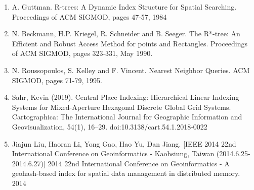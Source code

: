 %




\begin{enumerate}
    \item A. Guttman. R-trees: A Dynamic Index Structure for Spatial Searching. Proceedings of ACM SIGMOD, pages 47-57, 1984
    \item N. Beckmann, H.P. Kriegel, R. Schneider and B. Seeger. The R*-tree: An Efficient and Robust Access Method for points and Rectangles. Proceedings of ACM SIGMOD, pages 323-331, May 1990.
    \item N. Roussopoulos, S. Kelley and F. Vincent. Nearest Neighbor Queries. ACM SIGMOD, pages 71-79, 1995.
    \item Sahr, Kevin (2019). Central Place Indexing: Hierarchical Linear Indexing Systems for Mixed-Aperture Hexagonal Discrete Global Grid Systems. Cartographica: The International Journal for Geographic Information and Geovisualization, 54(1), 16–29. doi:10.3138/cart.54.1.2018-0022
    \item  Jiajun Liu, Haoran Li, Yong Gao, Hao Yu, Dan Jiang. [IEEE 2014 22nd International Conference on Geoinformatics - Kaohsiung, Taiwan (2014.6.25-2014.6.27)] 2014 22nd International Conference on Geoinformatics - A geohash-based index for spatial data management in distributed memory. 2014

\end{enumerate}

